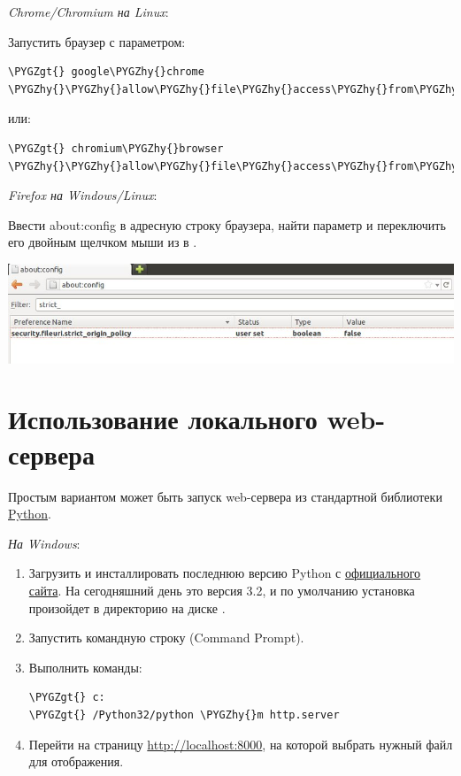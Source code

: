 \documentclass[a4paper,12pt,oneside]{sphinxmanual}
\def\PYGZgt{\char`\>}
\def\PYGZhy{\char`\-}
\begin{document}
\emph{Chrome/Chromium на Linux}:

Запустить браузер с параметром:

\begin{Verbatim}[commandchars=\\\{\}]
\PYGZgt{} google\PYGZhy{}chrome \PYGZhy{}\PYGZhy{}allow\PYGZhy{}file\PYGZhy{}access\PYGZhy{}from\PYGZhy{}files
\end{Verbatim}

или:

\begin{Verbatim}[commandchars=\\\{\}]
\PYGZgt{} chromium\PYGZhy{}browser \PYGZhy{}\PYGZhy{}allow\PYGZhy{}file\PYGZhy{}access\PYGZhy{}from\PYGZhy{}files
\end{Verbatim}

\emph{Firefox на Windows/Linux}:

Ввести about:config в адресную строку браузера, найти параметр  и переключить его двойным щелчком мыши из  в .

{\hfill\includegraphics[width=1.000\linewidth]{firefox_strict_origin.jpg}\hfill}


\section{Использование локального web-сервера}
\label{problems_and_solutions:local-web-server}\label{problems_and_solutions:web}
Простым вариантом может быть запуск web-сервера из стандартной библиотеки \href{http://ru.wikipedia.org/wiki/Python}{Python}.

\emph{На Windows}:
\begin{enumerate}
\item {} 
Загрузить и инсталлировать последнюю версию Python с \href{http://www.python.org/download/releases/}{официального сайта}. На сегодняшний день это версия 3.2, и по умолчанию установка произойдет в директорию  на диске .

\item {} 
Запустить командную строку (Command Prompt).

\item {} 
Выполнить команды:

\begin{Verbatim}[commandchars=\\\{\}]
\PYGZgt{} c:
\PYGZgt{} /Python32/python \PYGZhy{}m http.server
\end{Verbatim}

\item {} 
Перейти на страницу \href{http://localhost:8000}{http://localhost:8000}, на которой выбрать нужный файл для отображения.

\end{enumerate}
\end{document}
